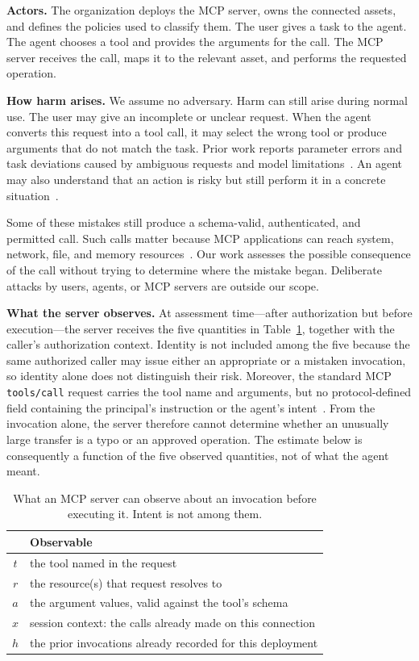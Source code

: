 \documentclass[sigconf]{acmart}
\begin{document}
\textbf{Actors.}
The organization deploys the MCP server, owns the connected assets, and defines
the policies used to classify them. The user gives a task to the agent. The
agent chooses a tool and provides the arguments for the call. The MCP server
receives the call, maps it to the relevant asset, and performs the requested
operation. 


\textbf{How harm arises.}
We assume no adversary. Harm can still arise during normal use. The user may
give an incomplete or unclear request. When the agent converts this request into
a tool call, it may select the wrong tool or produce arguments that do not match
the task. Prior work reports parameter errors and task deviations caused by
ambiguous requests and model limitations~\cite{xiong2025butterfly}. An agent
may also understand that an action is risky but still perform it in a concrete
situation~\cite{tang2025riskknowledge}.

Some of these mistakes still produce a schema-valid, authenticated, and
permitted call. Such calls matter because MCP applications can reach system,
network, file, and memory resources~\cite{li2025privilege}. Our work assesses
the possible consequence of the call without trying to determine where the
mistake began. Deliberate attacks by users, agents, or MCP servers are outside
our scope.


\textbf{What the server observes.} At assessment time---after authorization but before execution---the server receives the five quantities in Table~\ref{tab:observables}, together with the caller's authorization context. Identity is not included among the five because the same authorized caller may issue either an appropriate or a mistaken invocation, so identity alone does not distinguish their risk. Moreover, the standard MCP \texttt{tools/call} request carries the tool name and arguments, but no protocol-defined field containing the principal's instruction or the agent's intent~\cite{mcp2026spec}. From the invocation alone, the server therefore cannot determine whether an unusually large transfer is a typo or an approved operation. The estimate below is consequently a function of the five observed quantities, not of what the agent meant.


\begin{table}[t]
  \caption{What an MCP server can observe about an invocation before executing
  it. Intent is not among them.}
  \label{tab:observables}
  \begin{tabular}{@{}cl@{}}
    \toprule
    & Observable \\
    \midrule
    $t$ & the tool named in the request \\
    $r$ & the resource(s) that request resolves to \\
    $a$ & the argument values, valid against the tool's schema \\
    $x$ & session context: the calls already made on this connection \\
    $h$ & the prior invocations already recorded for this deployment \\
    \bottomrule
  \end{tabular}
\end{table}
\end{document}
